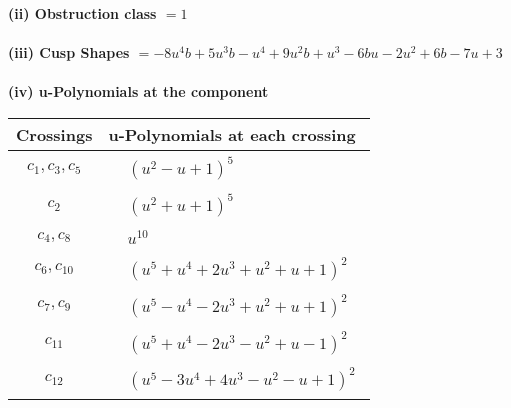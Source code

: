 \documentclass[1p]{elsarticle_modified}
\theoremstyle{definition}
\begin{document}
\flushleft \textbf{(ii) Obstruction class $= 1$}\\~\\
\flushleft \textbf{(iii) Cusp Shapes $= -8 u^4 b+5 u^3 b- u^4+9 u^2 b+u^3-6 b u-2 u^2+6 b-7 u+3$}\\~\\
\newpage\renewcommand{\arraystretch}{1}
\flushleft \textbf{(iv) u-Polynomials at the component}\newline \\
\begin{tabular}{m{50pt}|m{274pt}}
Crossings & \hspace{64pt}u-Polynomials at each crossing \\
\hline $$\begin{aligned}c_{1},c_{3},c_{5}\end{aligned}$$&$\begin{aligned}
&(u^2- u+1)^5
\end{aligned}$\\
\hline $$\begin{aligned}c_{2}\end{aligned}$$&$\begin{aligned}
&(u^2+u+1)^5
\end{aligned}$\\
\hline $$\begin{aligned}c_{4},c_{8}\end{aligned}$$&$\begin{aligned}
&u^{10}
\end{aligned}$\\
\hline $$\begin{aligned}c_{6},c_{10}\end{aligned}$$&$\begin{aligned}
&(u^5+u^4+2 u^3+u^2+u+1)^2
\end{aligned}$\\
\hline $$\begin{aligned}c_{7},c_{9}\end{aligned}$$&$\begin{aligned}
&(u^5- u^4-2 u^3+u^2+u+1)^2
\end{aligned}$\\
\hline $$\begin{aligned}c_{11}\end{aligned}$$&$\begin{aligned}
&(u^5+u^4-2 u^3- u^2+u-1)^2
\end{aligned}$\\
\hline $$\begin{aligned}c_{12}\end{aligned}$$&$\begin{aligned}
&(u^5-3 u^4+4 u^3- u^2- u+1)^2
\end{aligned}$\\
\hline
\end{tabular}\\~\\
\end{document}
